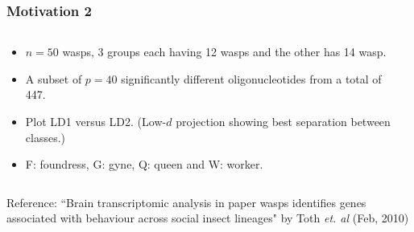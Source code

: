 \documentclass{beamer}
\begin{document}
\begin{frame}
     \frametitle{Motivation 2 }
	\begin{columns}
		\begin{column}{0.4\textwidth}
		  \begin{itemize}
		   \item $n=50$ wasps, 3 groups each having 12 wasps and the other has 14 wasp.

			  \item A subset of $p=40$ significantly different oligonucleotides from a total of 447.
			                                       \item Plot LD1 versus LD2. (Low-$d$ projection showing best separation between classes.)
			 \item F: foundress, G: gyne, Q: queen and W: worker.
		  \end{itemize}		
			
		\end{column}
		
		\begin{column}{0.6\textwidth}
			\begin{center}  \end{center}
		\end{column}
	\end{columns} 
\vspace{0.05cm}

	\tiny{ Reference: ``Brain transcriptomic analysis in paper wasps identifies genes associated with behaviour across social insect lineages" by Toth {\em et. al} (Feb, 2010)}
	
\end{frame}
\end{document}
